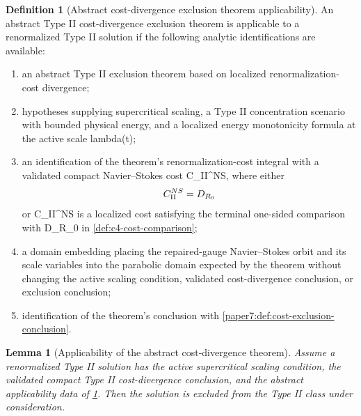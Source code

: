 \documentclass[11pt]{amsart}
\def\({}%
\def\){}%
\def\tilde#1{#1}%
\def\mathfrak#1{#1}%
\def\lambda{lambda}%
\theoremstyle{plain}
\newtheorem{lemma}[lemma]{Lemma}
\theoremstyle{definition}
\newtheorem{definition}[definition]{Definition}
\theoremstyle{remark}
\begin{document}
\begin{definition}[Abstract cost-divergence exclusion theorem applicability]
\label{paper7:def:abstract-cost-exclusion-applicability}
An abstract Type II cost-divergence exclusion theorem is applicable to a
renormalized Type II solution if the following analytic identifications are
available:
\begin{enumerate}[label=\textup{(\roman*)}]
\item an abstract Type II exclusion theorem based on localized
renormalization-cost divergence;
\item hypotheses supplying supercritical scaling, a Type II concentration
scenario with bounded physical energy, and a localized energy monotonicity
formula at the active scale \(\lambda(t)\);
\item an identification of the theorem's renormalization-cost integral with a
validated compact Navier--Stokes cost \(\mathfrak C_{\rm II}^{NS}\), where
either
\[
  \mathfrak C_{\rm II}^{NS}=\tilde{\mathfrak D}_{R_0}
\]
or \(\mathfrak C_{\rm II}^{NS}\) is a localized cost satisfying the terminal
one-sided comparison with \(\tilde{\mathfrak D}_{R_0}\) in
\cref{def:c4-cost-comparison};
\item a domain embedding placing the repaired-gauge Navier--Stokes orbit and
its scale variables into the parabolic domain expected by the theorem without
changing the active scaling condition, validated cost-divergence conclusion, or
exclusion conclusion;
\item identification of the theorem's conclusion with
\cref{paper7:def:cost-exclusion-conclusion}.
\end{enumerate}
\end{definition}

\begin{lemma}[Applicability of the abstract cost-divergence theorem]
\label{paper7:lem:abstract-cost-exclusion}
Assume a renormalized Type II solution has the active supercritical scaling
condition, the validated compact Type II cost-divergence conclusion, and the
abstract applicability data of
\cref{paper7:def:abstract-cost-exclusion-applicability}.
Then the solution is excluded from the Type II class under consideration.
\end{lemma}
\end{document}
